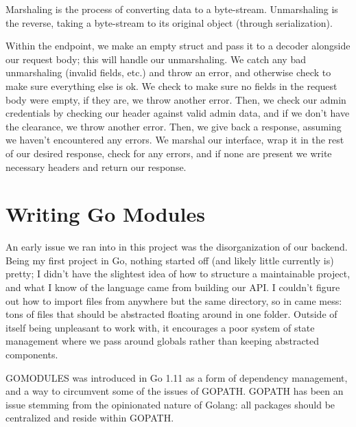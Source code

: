 \documentclass[11pt, twoside, reqno]{book}
\begin{document}
\begin{remark}[Marshaling]
Marshaling is the process of converting data to a byte-stream. Unmarshaling is the reverse, taking a byte-stream to its original object (through serialization).
\end{remark}

Within the endpoint, we make an empty struct and pass it to a decoder alongside our request body; this will handle our unmarshaling. We catch any bad unmarshaling (invalid fields, etc.) and throw an error, and otherwise check to make sure everything else is ok. We check to make sure no fields in the request body were empty, if they are, we throw another error. Then, we check our admin credentials by checking our header against valid admin data, and if we don't have the clearance, we throw another error. Then, we give back a response, assuming we haven't encountered any errors. We marshal our interface, wrap it in the rest of our desired response, check for any errors, and if none are present we write necessary headers and return our response.

\section{Writing Go Modules}

An early issue we ran into in this project was the disorganization of our backend. Being my first project in Go, nothing started off (and likely little currently is) pretty; I didn't have the slightest idea of how to structure a maintainable project, and what I know of the language came from building our API. I couldn't figure out how to import files from anywhere but the same directory, so in came mess: tons of files that should be abstracted floating around in one folder. Outside of itself being unpleasant to work with, it encourages a poor system of state management where we pass around globals rather than keeping abstracted components.

GOMODULES was introduced in Go 1.11 as a form of dependency management, and a way to circumvent some of the issues of GOPATH. GOPATH has been an issue stemming from the opinionated nature of Golang: all packages should be centralized and reside within GOPATH.

\begin{quote}
\end{quote}
\end{document}
